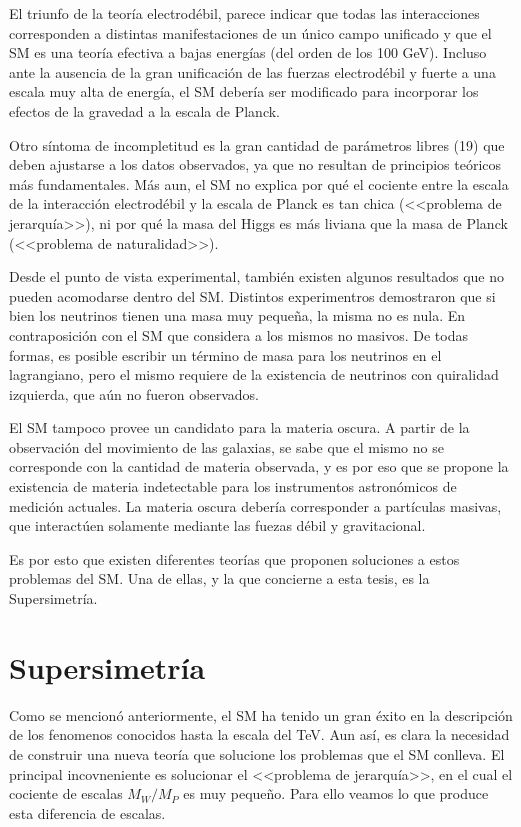 El triunfo de la teoría electrodébil, parece indicar que todas las interacciones corresponden a distintas manifestaciones de un único campo unificado y que el SM es una teoría efectiva a bajas energías (del orden de los 100 GeV).  Incluso ante la ausencia de la gran unificación de las fuerzas electrodébil y fuerte a una escala muy alta de energía, el SM debería ser modificado para incorporar los efectos de la gravedad a la escala de Planck.

Otro síntoma de incompletitud es la gran cantidad de parámetros libres (19) que deben ajustarse a los datos observados, ya que no resultan de principios teóricos más fundamentales. Más aun, el SM no explica por qué el cociente entre la escala de la interacción electrodébil y la escala de Planck es tan chica (<<problema de jerarquía>>), ni por qué la masa del Higgs es más liviana que la masa de Planck (<<problema de naturalidad>>).

Desde el punto de vista experimental, también existen algunos resultados que no pueden acomodarse dentro del SM. Distintos experimentros demostraron que si bien los neutrinos tienen una masa muy pequeña, la misma no es nula. En contraposición con el SM que considera a los mismos no masivos. De todas formas, es posible escribir un término de masa para los neutrinos en el lagrangiano, pero el mismo requiere de la existencia de neutrinos con quiralidad izquierda, que aún no fueron observados.

El SM tampoco provee un candidato para la materia oscura. A partir de la observación del movimiento de las galaxias, se sabe que el mismo no se corresponde con la cantidad de materia observada, y es por eso que se propone la existencia de materia indetectable para los instrumentos astronómicos de medición actuales. La materia oscura debería corresponder a partículas masivas, que interactúen solamente mediante las fuezas débil y gravitacional.

Es por esto que existen diferentes teorías que proponen soluciones a estos problemas del SM. Una de ellas, y la que concierne a esta tesis, es la Supersimetría.

\section{Supersimetría}

Como se mencionó anteriormente, el SM ha tenido un gran éxito en la descripción de los fenomenos conocidos hasta la escala del TeV. Aun así, es clara la necesidad de construir una nueva teoría que solucione los problemas que el SM conlleva. El principal incovneniente es solucionar el <<problema de jerarquía>>, en el cual el cociente de escalas $M_{W}/M_{P}$ es muy pequeño. Para ello veamos lo que produce esta diferencia de escalas.

